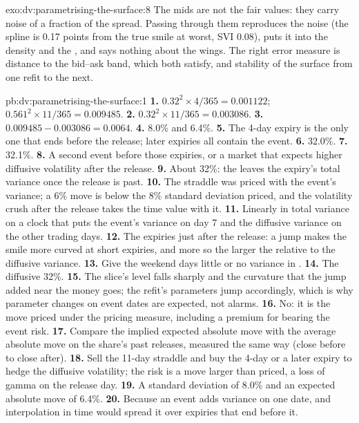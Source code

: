 \begin{solution}{exo:dv:parametrising-the-surface:8}
The mids are not the fair values: they carry noise of a fraction of the spread. Passing through them
reproduces the noise (the spline is 0.17 points from the true smile at worst, SVI 0.08), puts it into
the density and the , and says nothing about the wings. The right error measure is distance to the
bid--ask band, which both satisfy, and stability of the surface from one refit to the next.
\end{solution}

\begin{solution}{pb:dv:parametrising-the-surface:1}
\textbf{1.} $0.32^2\times4/365=0.001122$; $0.561^2\times11/365=0.009485$.
\textbf{2.} $0.32^2\times11/365=0.003086$.
\textbf{3.} $0.009485-0.003086=0.0064$.
\textbf{4.} 8.0\% and 6.4\%.
\textbf{5.} The 4-day expiry is the only one that ends before the release; later expiries all contain
the event.
\textbf{6.} 32.0\%.
\textbf{7.} 32.1\%.
\textbf{8.} A second event before those expiries, or a market that expects higher diffusive volatility
after the release.
\textbf{9.} About 32\%: the  leaves the expiry's total variance once the release is past.
\textbf{10.} The straddle was priced with the event's variance; a 6\% move is below the 8\% standard
deviation priced, and the volatility crush after the release takes the time value with it.
\textbf{11.} Linearly in total variance on a clock that puts the event's variance on day 7 and the
diffusive variance on the other trading days.
\textbf{12.} The expiries just after the release: a jump makes the smile more curved at short expiries,
and more so the larger the  relative to the diffusive variance.
\textbf{13.} Give the weekend days little or no variance in .
\textbf{14.} The diffusive 32\%.
\textbf{15.} The slice's level falls sharply and the curvature that the jump added near the money goes;
the refit's parameters jump accordingly, which is why parameter changes on event dates are expected, not
alarms.
\textbf{16.} No: it is the move priced under the pricing measure, including a premium for bearing the
event risk.
\textbf{17.} Compare the implied expected absolute move with the average absolute move on the share's past
releases, measured the same way (close before to close after).
\textbf{18.} Sell the 11-day straddle and buy the 4-day or a later expiry to hedge the diffusive
volatility; the risk is a move larger than priced, a loss of gamma on the release day.
\textbf{19.} A standard deviation of 8.0\% and an expected absolute move of 6.4\%.
\textbf{20.} Because an event adds variance on one date, and interpolation in time would spread it over
expiries that end before it.
\end{solution}

